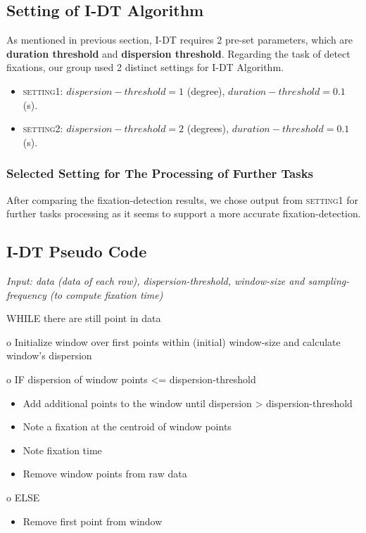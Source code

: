 \documentclass[sigchi-a]{acmart}
\begin{document}
\subsection{Setting of I-DT Algorithm}
As mentioned in previous section, I-DT requires 2 pre-set parameters, which are \textbf{duration threshold} and \textbf{dispersion threshold}. Regarding the task of detect fixations, our group used 2 distinct settings for I-DT Algorithm.
\begin{itemize}
    \item \textsc{setting1}: $dispersion-threshold = 1$ (degree), $duration-threshold = 0.1$ (s).
    \item \textsc{setting2}: $dispersion-threshold = 2$ (degrees), $duration-threshold = 0.1$ (s).
\end{itemize}

\subsubsection{Selected Setting for The Processing of Further Tasks}
After comparing the fixation-detection results, we chose output from \textsc{setting1} for further tasks processing as it seems to support a more accurate fixation-detection.

\subsection{I-DT Pseudo Code \cite{Salvucci2000}}
\textit{Input: data (data of each row), dispersion-threshold, window-size and sampling-frequency (to compute fixation time)}


WHILE there are still point in data

o Initialize window over first points within (initial) window-size and calculate window's dispersion

o IF dispersion of window points <= dispersion-threshold
\begin{itemize}
    \item Add additional points to the window until dispersion > dispersion-threshold
    \item Note a fixation at the centroid of window points
    \item Note fixation time
    \item Remove window points from raw data
\end{itemize}
    
o ELSE 
\begin{itemize}
    \item Remove first point from window
\end{itemize}
\end{document}
